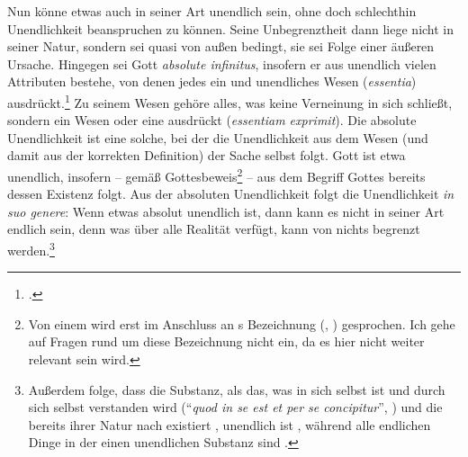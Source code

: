 Nun könne etwas auch in seiner Art unendlich sein, ohne doch schlechthin
Unendlichkeit beanspruchen zu können. Seine Unbegrenztheit dann liege nicht in seiner
Natur, sondern sei quasi von außen bedingt, sie sei Folge einer äußeren Ursache.
Hingegen sei Gott \emph{absolute infinitus}, insofern er aus unendlich vielen
Attributen bestehe, von denen jedes ein  und unendliches
Wesen (\emph{essentia})
ausdrückt.\footnote{\cite[Vgl.][\nopp
1d6]{Spinoza:EthikingeometrischerOrdnungdargestellt2007}.} Zu seinem
Wesen gehöre alles, was keine Verneinung in sich schließt, sondern ein
Wesen oder eine  ausdrückt (\emph{essentiam exprimit}). Die
absolute Unendlichkeit ist eine solche, bei der die Unendlichkeit aus dem Wesen
(und damit aus der korrekten Definition) der Sache selbst folgt. Gott ist etwa
unendlich, insofern -- gemäß 
Gottesbeweis\footnote{Von einem  wird
erst im Anschluss an s Bezeichnung
\mkbibparens{\cite[vgl.][B 619]{Kant:KritikderreinenVernunft2003},
\cite[][III: 396.29--31]{Kant:GesammelteWerke1900ff.}} gesprochen.
Ich gehe auf Fragen rund um diese Bezeichnung nicht ein, da es hier nicht weiter
relevant sein wird.} -- aus dem Begriff Gottes bereits dessen Existenz folgt.
Aus der absoluten Unendlichkeit folgt die Unendlichkeit \emph{in suo
  genere}: Wenn etwas absolut unendlich ist, dann kann es nicht in seiner
Art endlich sein, denn was über alle Realität verfügt, kann von nichts
begrenzt werden.\footnote{Außerdem folge, dass die Substanz, als das, was in
sich selbst ist und durch sich selbst verstanden
wird \mkbibparens{\enquote{\emph{quod in se est et per se concipitur}},
\cite[][\nopp 1d3]{Spinoza:EthikingeometrischerOrdnungdargestellt2007}}
und die bereits ihrer Natur nach existiert
\parencite[Vgl.][1p7]{Spinoza:EthikingeometrischerOrdnungdargestellt2007},
unendlich ist \parencite[vgl.][\nopp
1p8]{Spinoza:EthikingeometrischerOrdnungdargestellt2007}, während alle endlichen
Dinge in der einen unendlichen Substanz sind
\parencite[vgl.][1p15]{Spinoza:EthikingeometrischerOrdnungdargestellt2007}.}


